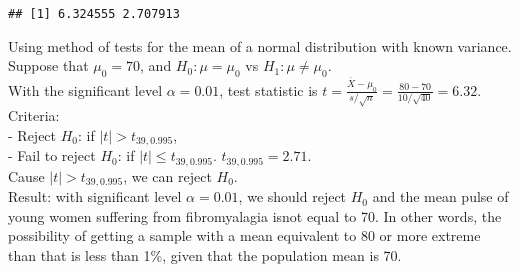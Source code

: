 \documentclass[
]{article}
\begin{document}
\begin{verbatim}
## [1] 6.324555 2.707913
\end{verbatim}

Using method of tests for the mean of a normal distribution with known
variance.\\
Suppose that \(\mu_0=70\), and \(H_0:\mu=\mu_0\) vs
\(H_1:\mu\neq\mu_0\).\\
With the significant level \(\alpha=0.01\), test statistic is
\(t=\frac{\overline{X}-\mu_0}{s/\sqrt{n}}=\frac{80-70}{10/\sqrt{40}}=6.32\).\\
Criteria:\\
- Reject \(H_0\): if \(|t|>t_{39,0.995}\),\\
- Fail to reject \(H_0\): if \(|t|\leq t_{39,0.995}\).
\(t_{39,0.995}=2.71\).\\
Cause \(|t|>t_{39,0.995}\), we can reject \(H_0\).\\
Result: with significant level \(\alpha=0.01\), we should reject \(H_0\)
and the mean pulse of young women suffering from fibromyalagia isnot
equal to 70. In other words, the possibility of getting a sample with a
mean equivalent to 80 or more extreme than that is less than 1\%, given
that the population mean is 70.
\end{document}
